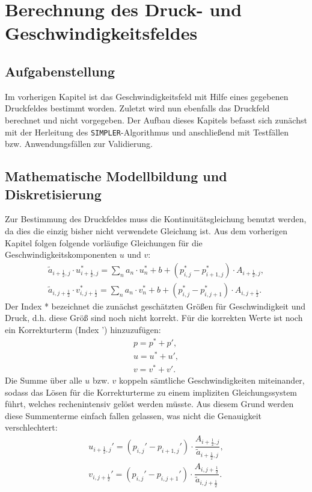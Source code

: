 \chapter{Berechnung des Druck- und Geschwindigkeitsfeldes}

\section{Aufgabenstellung}
Im vorherigen Kapitel ist das Geschwindigkeitsfeld mit Hilfe eines gegebenen Druckfeldes bestimmt worden. Zuletzt wird nun ebenfalls das Druckfeld berechnet und nicht vorgegeben. Der Aufbau dieses Kapitels befasst sich zun\"achst mit der Herleitung des \texttt{SIMPLER}-Algorithmus und anschlie\ss{}end mit Testf\"allen bzw. Anwendungsf\"allen zur Validierung. 


\section{Mathematische Modellbildung und Diskretisierung}
Zur Bestimmung des Druckfeldes muss die Kontinuit\"atsgleichung benutzt werden, da dies die einzig bisher nicht verwendete Gleichung ist. Aus dem vorherigen Kapitel folgen folgende vorl\"aufige Gleichungen f\"ur die Geschwindigkeitskomponenten $u$ und $v$:
\begin{align}
\tilde{a}_{i+\frac{1}{2},j}\cdot u_{i+\frac{1}{2},j}^{*}=\sum\limits_{n}a_{n}\cdot u_{n}^{*} + b + \left(p_{i,j}^{*}-p_{i+1,j}^{*}\right)\cdot A_{i+\frac{1}{2},j}, \\
\tilde{a}_{i,j+\frac{1}{2}}\cdot v_{i,j+\frac{1}{2}}^{*}=\sum\limits_{n}a_{n}\cdot v_{n}^{*} + b + \left(p_{i,j}^{*}-p_{i,j+1}^{*}\right)\cdot A_{i,j+\frac{1}{2}}.
\end{align}
Der Index * bezeichnet die zun\"achst gesch\"atzten Gr\"o\ss{}en f\"ur Geschwindigkeit und Druck, d.h. diese Gr\"o\ss{} sind noch nicht korrekt. F\"ur die korrekten Werte ist noch ein Korrekturterm (Index ') hinzuzuf\"ugen:
\begin{align}
p=p^{*}+p', \\
u=u^{*}+u', \\
v=v^{*}+v'.
\end{align}
Die Summe \"uber alle $u$ bzw. $v$ koppeln s\"amtliche Geschwindigkeiten miteinander, sodass das L\"osen f\"ur die Korrekturterme zu einem impliziten Gleichungssystem f\"uhrt, welches rechenintensiv gel\"ost werden m\"usste. Aus diesem Grund werden diese Summenterme einfach fallen gelassen, was nicht die Genauigkeit verschlechtert:
\begin{align}
u_{i+\frac{1}{2},j}'= \left(p_{i,j}'-p_{i+1,j}'\right)\cdot \dfrac{A_{i+\frac{1}{2},j}}{\tilde{a}_{i+\frac{1}{2},j}}, \label{eq:u'}\\
v_{i,j+\frac{1}{2}}'= \left(p_{i,j}'-p_{i,j+1}'\right)\cdot \dfrac{A_{i,j+\frac{1}{2}}}{\tilde{a}_{i,j+\frac{1}{2}}}.\label{eq:v'}
\end{align}
